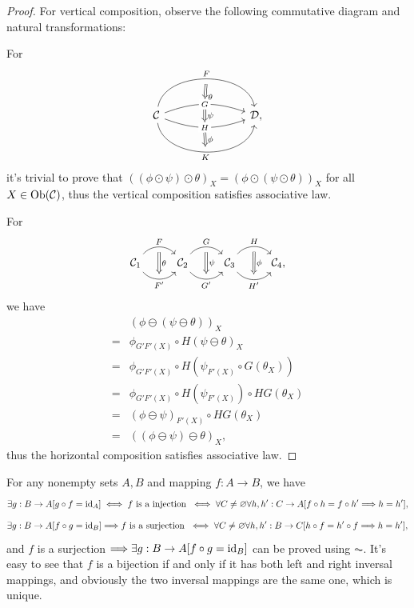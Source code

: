 \documentclass{article}
\begin{document}
\begin{proof}
	For vertical composition, observe the following commutative diagram and natural transformations:

	For
	\[\begin{tikzcd}	%
		\ca
		\arrow[rrr, bend left =80, "F", ""' name=F]
		\arrow[rrr, bend left =20, "G" description, "" name=G, ""' name=GG] 
		\arrow[rrr, bend right=20, "H" description, "" name=H, ""' name=HH]
		\arrow[rrr, bend right=80, "K"', "" name=K] & & &
		\D,
		\arrow[Rightarrow, "\theta", from=F, to=G]
		\arrow[Rightarrow, "\psi" , from=GG, to=H]
		\arrow[Rightarrow, "\phi" , from=HH, to=K]
	\end{tikzcd}\]
	it's trivial to prove that $((\phi\odot\psi)\odot\theta)_X=(\phi\odot(\psi\odot\theta))_X$ for all $X\in \mathrm{Ob}(\mathcal{C})$, thus the vertical composition satisfies associative law.

	For
	\begin{equation}\begin{tikzcd}\label{ass}
		\ca_1 \arrow[bend left=50, r, "F", ""' name=F] \arrow[bend right=50, r, "F'"', "" name=F'] &
		\ca_2 \arrow[bend left=50, r, "G", ""' name=G] \arrow[bend right=50, r, "G'"', "" name=G'] &	
		\ca_3 \arrow[bend left=50, r, "H", ""' name=H] \arrow[bend right=50, r, "H'"', "" name=H'] &
		\arrow[Rightarrow, from=F, to=F', "\theta"]
		\arrow[Rightarrow, from=G, to=G', "\psi"]
		\arrow[Rightarrow, from=H, to=H', "\phi"]
		\ca_4,
	\end{tikzcd}\end{equation}
	we have
	\begin{align*}
		 & (\phi\ominus(\psi\ominus\theta))_X\\
		=& \phi_{G'F'(X)}\circ H(\psi\ominus\theta)_X\tag{Def: horizontal composition}\\
		=& \phi_{G'F'(X)}\circ H(\psi_{F'(X)}\circ G(\theta_X))\tag{Ditto}\\
		=& \phi_{G'F'(X)}\circ H(\psi_{F'(X)})\circ HG(\theta_X)\tag{Property of functor $H$}\\
		=& (\phi\ominus\psi)_{F'(X)}\circ HG(\theta_X)\tag{Def: horizontal composition}\\
		=& ((\phi\ominus\psi)\ominus\theta)_X\tag{Ditto},
	\end{align*}
	thus the horizontal composition satisfies associative law.
\end{proof}


\begin{lmm}[$\mathsf{ZF}$]\label{map}
	For any nonempty sets $A,B$ and mapping $f:A\to B$, we have
		\[\exists g:B\to A[g\circ f=\mathrm{id}_A]\iff f\ \text{is a injection}\ \iff\forall C\ne\varnothing\forall h,h':C\to A[f\circ h=f\circ h'\Longrightarrow h=h'],\]
		\[\exists g:B\to A[f\circ g=\mathrm{id}_B]\Longrightarrow f\ \text{is a surjection}\ \iff\forall C\ne\varnothing\forall h,h':B\to C[h\circ f=h'\circ f\Longrightarrow h=h'],\]
	and $f$ is a surjection $\Longrightarrow \exists g:B\to A[f\circ g=\mathrm{id}_B]$ can be proved using $\AC$.
	It's easy to see that $f$ is a bijection if and only if it has both left and right inversal mappings, and obviously the two inversal mappings are the same one, which is unique.
\end{lmm}
\end{document}
